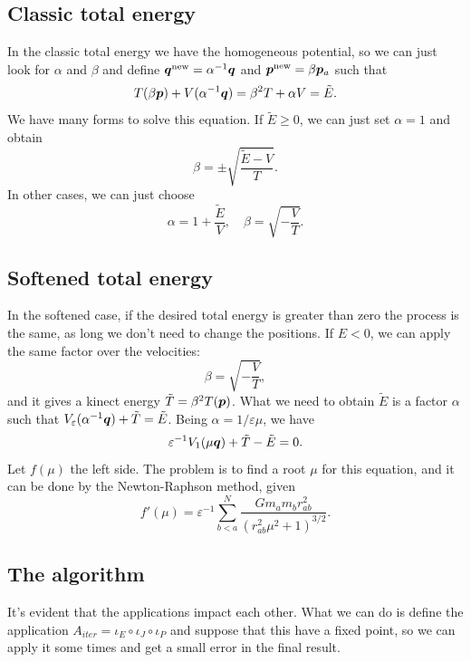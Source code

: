 \documentclass{article}
\begin{document}
\subsection{Classic total energy}
In the classic total energy we have the homogeneous potential, so we can just look for $\alpha$ and $\beta$ and define $\bm q^{\text{new}} = \alpha^{-1} \bm q$ and $\bm p^{\text{new}} = \beta \bm p_a$ such that
\begin{equation}
    T(\beta \bm p) + V(\alpha^{-1} \bm q)
    = \beta^2 T + \alpha V = \tilde E.
\end{equation}
We have many forms to solve this equation. If $\tilde E \geq 0$, we can just set $\alpha = 1$ and obtain
\begin{equation}
\beta = \pm \sqrt{\dfrac{\tilde E - V}{T}}.
\end{equation}
In other cases, we can just choose
\begin{equation}
    \alpha = 1 + \dfrac{\tilde E}{V},
    \quad
    \beta = \sqrt{- \dfrac{V}{T}}.
\end{equation}

\subsection{Softened total energy}
In the softened case, if the desired total energy is greater than zero the process is the same, as long we don't need to change the positions. If $E < 0$, we can apply the same factor over the velocities:
\begin{equation}
\beta = \sqrt{- \dfrac{V}{T}},
\end{equation}
and it gives a kinect energy $\tilde T = \beta^2 T(\bm p)$. What we need to obtain $\tilde E$ is a factor $\alpha$ such that $V_{\varepsilon}(\alpha^{-1} \bm q) + \tilde T = \tilde E$. Being $\alpha = 1/\varepsilon \mu$, we have
\begin{equation}
\varepsilon^{-1} V_1 (\mu \bm q) + \tilde T - \tilde E = 0.
\end{equation}
Let $f(\mu)$ the left side. The problem is to find a root $\mu$ for this equation, and it can be done by the Newton-Raphson method, given
\begin{equation}
    f'(\mu) = \varepsilon^{-1} \sum_{b < a}^N \dfrac{G m_a m_b r_{ab}^2}{(r_{ab}^2 \mu^2 + 1)^{3/2}}.
\end{equation}

\subsection{The algorithm}
It's evident that the applications impact each other. What we can do is define the application $A_{iter} = \iota_E \circ \iota_J \circ \iota_P$ and suppose that this have a fixed point, so we can apply it some times and get a small error in the final result.
\end{document}

